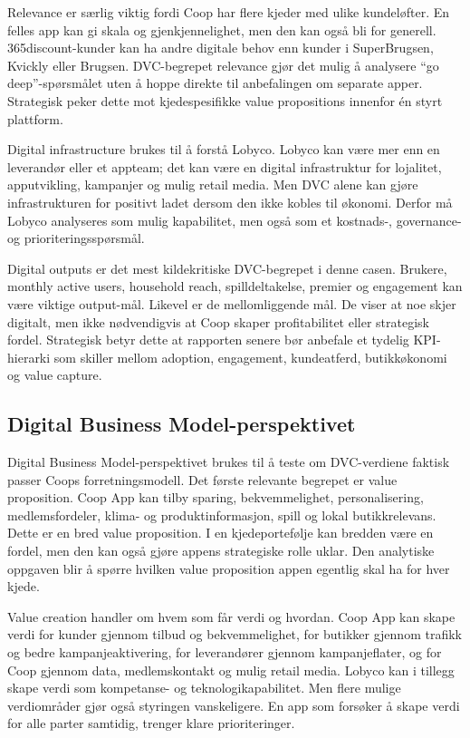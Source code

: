 \documentclass[12pt,a4paper]{article}
\begin{document}
Relevance er særlig viktig fordi Coop har flere kjeder med ulike kundeløfter. En felles app kan gi skala og gjenkjennelighet, men den kan også bli for generell. 365discount-kunder kan ha andre digitale behov enn kunder i SuperBrugsen, Kvickly eller Brugsen. DVC-begrepet relevance gjør det mulig å analysere ``go deep''-spørsmålet uten å hoppe direkte til anbefalingen om separate apper. Strategisk peker dette mot kjedespesifikke value propositions innenfor én styrt plattform.

Digital infrastructure brukes til å forstå Lobyco. Lobyco kan være mer enn en leverandør eller et appteam; det kan være en digital infrastruktur for lojalitet, apputvikling, kampanjer og mulig retail media. Men DVC alene kan gjøre infrastrukturen for positivt ladet dersom den ikke kobles til økonomi. Derfor må Lobyco analyseres som mulig kapabilitet, men også som et kostnads-, governance- og prioriteringsspørsmål.

Digital outputs er det mest kildekritiske DVC-begrepet i denne casen. Brukere, monthly active users, household reach, spilldeltakelse, premier og engagement kan være viktige output-mål. Likevel er de mellomliggende mål. De viser at noe skjer digitalt, men ikke nødvendigvis at Coop skaper profitabilitet eller strategisk fordel. Strategisk betyr dette at rapporten senere bør anbefale et tydelig KPI-hierarki som skiller mellom adoption, engagement, kundeatferd, butikkøkonomi og value capture.

\subsection{Digital Business Model-perspektivet}

Digital Business Model-perspektivet brukes til å teste om DVC-verdiene faktisk passer Coops forretningsmodell. Det første relevante begrepet er value proposition. Coop App kan tilby sparing, bekvemmelighet, personalisering, medlemsfordeler, klima- og produktinformasjon, spill og lokal butikkrelevans. Dette er en bred value proposition. I en kjedeportefølje kan bredden være en fordel, men den kan også gjøre appens strategiske rolle uklar. Den analytiske oppgaven blir å spørre hvilken value proposition appen egentlig skal ha for hver kjede.

Value creation handler om hvem som får verdi og hvordan. Coop App kan skape verdi for kunder gjennom tilbud og bekvemmelighet, for butikker gjennom trafikk og bedre kampanjeaktivering, for leverandører gjennom kampanjeflater, og for Coop gjennom data, medlemskontakt og mulig retail media. Lobyco kan i tillegg skape verdi som kompetanse- og teknologikapabilitet. Men flere mulige verdiområder gjør også styringen vanskeligere. En app som forsøker å skape verdi for alle parter samtidig, trenger klare prioriteringer.
\end{document}

